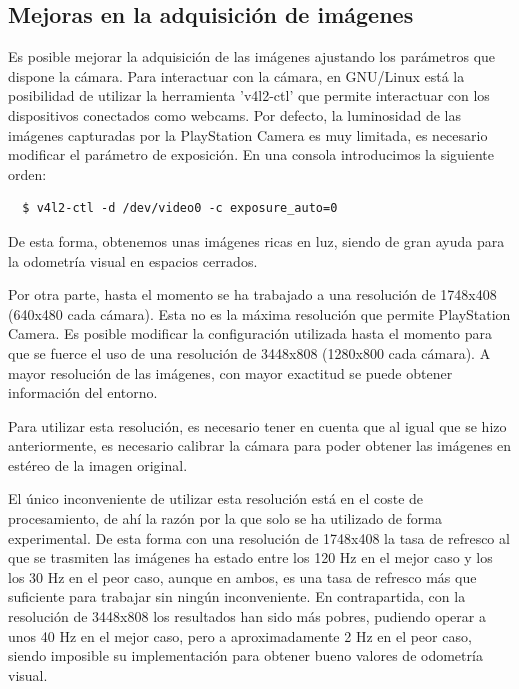 \subsection{Mejoras en la adquisición de imágenes}

Es posible mejorar la adquisición de las imágenes ajustando los parámetros que
dispone la cámara. Para interactuar con la cámara, en GNU/Linux está la
posibilidad de utilizar la herramienta 'v4l2-ctl' que permite interactuar con
los dispositivos conectados como webcams. Por defecto, la luminosidad de las
imágenes capturadas por la PlayStation Camera es muy limitada, es necesario
modificar el parámetro de exposición. En una consola introducimos la siguiente
orden:
\\
\begin{lstlisting}
  $ v4l2-ctl -d /dev/video0 -c exposure_auto=0
\end{lstlisting}

De esta forma, obtenemos unas imágenes ricas en luz, siendo de gran ayuda para
la odometría visual en espacios cerrados.

Por otra parte, hasta el momento se ha trabajado a una resolución de 1748x408
(640x480 cada cámara). Esta no es la máxima resolución que permite PlayStation
Camera. Es posible modificar la configuración utilizada hasta el momento para
que se fuerce el uso de una resolución de 3448x808 (1280x800 cada cámara). A
mayor resolución de las imágenes, con mayor exactitud se puede obtener
información del entorno.

Para utilizar esta resolución, es necesario tener en cuenta que al igual que se
hizo anteriormente, es necesario calibrar la cámara para poder obtener las
imágenes en estéreo de la imagen original.

El único inconveniente de utilizar esta resolución está en el coste de
procesamiento, de ahí la razón por la que solo se ha utilizado de forma
experimental. De esta forma con una resolución de 1748x408 la tasa de refresco
al que se trasmiten las imágenes ha estado entre los 120 Hz en el mejor caso y
los los 30 Hz en el peor caso, aunque en ambos, es una tasa de refresco más que
suficiente para trabajar sin ningún inconveniente. En contrapartida, con la
resolución de 3448x808 los resultados han sido más pobres, pudiendo operar a
unos 40 Hz en el mejor caso, pero a aproximadamente 2 Hz en el peor caso, siendo
imposible su implementación para obtener bueno valores de odometría visual.

